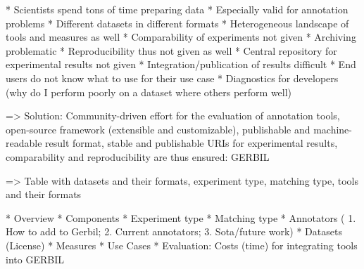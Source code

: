 * Scientists spend tons of time preparing data
* Especially valid for annotation problems
* Different datasets in different formats
* Heterogeneous landscape of tools and measures as well
* Comparability of experiments not given
* Archiving problematic
* Reproducibility thus not given as well
* Central repository for experimental results not given
* Integration/publication of results difficult
* End users do not know what to use for their use case
* Diagnostics for developers (why do I perform poorly on a dataset where others perform well)

=> Solution: Community-driven effort for the evaluation of annotation tools, open-source framework (extensible and customizable), publishable and machine-readable result format, stable and publishable URIs for experimental results, comparability and reproducibility are thus ensured: GERBIL

=> Table with datasets and their formats, experiment type, matching type, tools and their formats

* Overview
* Components
	* Experiment type
	* Matching type
	* Annotators (	1. How to add to Gerbil; 2. Current annotators; 3. Sota/future work)
	* Datasets (License)
	* Measures
* Use Cases
* Evaluation: Costs (time) for integrating tools into GERBIL